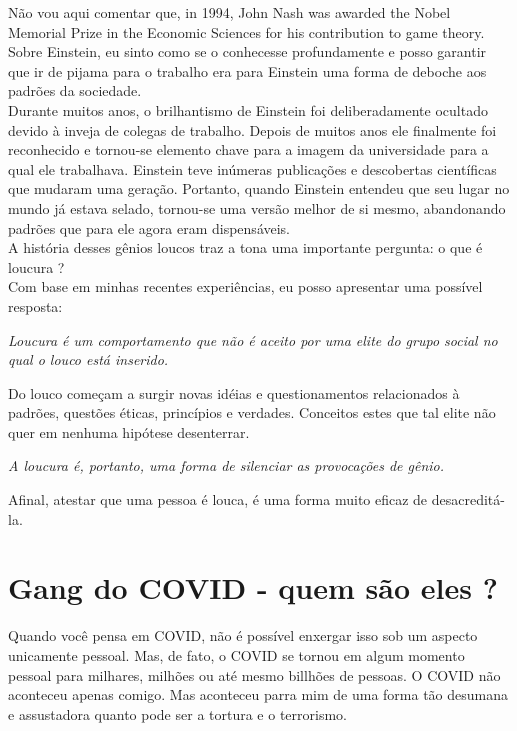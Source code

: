 \documentclass[11pt]{book}
\begin{document}
Não vou aqui comentar que, in 1994, John Nash was awarded the Nobel Memorial Prize in the Economic Sciences for his contribution to game theory. \\

Sobre Einstein, eu sinto como se o conhecesse profundamente e posso garantir que ir de pijama para o trabalho era para Einstein uma forma de deboche aos padrões da sociedade. \\

Durante muitos anos, o brilhantismo de Einstein foi deliberadamente ocultado devido à inveja de colegas de trabalho. Depois de muitos anos ele finalmente foi reconhecido e tornou-se elemento chave para a imagem da universidade para a qual ele trabalhava. Einstein teve inúmeras publicações e descobertas científicas que mudaram uma geração. Portanto, quando Einstein entendeu que seu lugar no mundo já estava selado, tornou-se uma versão melhor de si mesmo, abandonando padrões que para ele agora eram dispensáveis. \\

A história desses gênios loucos traz a tona uma importante pergunta: o que é loucura ? \\

\noindent Com base em minhas recentes experiências, eu posso apresentar uma possível resposta: \\

\noindent \begin{center} \emph{Loucura é um comportamento que não é aceito por uma elite do grupo social no qual o louco está inserido.} \end{center}

Do louco começam a surgir novas idéias e questionamentos relacionados à padrões, questões éticas, princípios e verdades. Conceitos estes que tal elite não quer em nenhuma hipótese desenterrar.

\noindent \begin{center} \emph{A loucura é, portanto, uma forma de silenciar as provocações de gênio.} \end{center}

Afinal, atestar que uma pessoa é louca, é uma forma muito eficaz de desacreditá-la.  \\

\chapter{Gang do COVID - quem são eles ?}

\noindent Quando você pensa em COVID, não é possível enxergar isso sob um aspecto unicamente pessoal. Mas, de fato, o COVID se tornou em algum momento pessoal para milhares, milhões ou até mesmo billhões de pessoas. O COVID não aconteceu apenas comigo. Mas aconteceu parra mim de uma forma tão desumana e assustadora quanto pode ser a tortura e o terrorismo. \\
\end{document}
